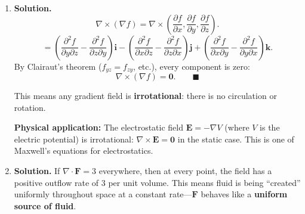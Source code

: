 \begin{enumerate}
Regrouping:
\[
= f\left(\frac{\partial F_1}{\partial x}+\frac{\partial F_2}{\partial y}+\frac{\partial F_3}{\partial z}\right)+\left(F_1\frac{\partial f}{\partial x}+F_2\frac{\partial f}{\partial y}+F_3\frac{\partial f}{\partial z}\right).
\]

\textbf{Right side:}
\[
f(\nabla\cdot\mathbf{F})+\mathbf{F}\cdot(\nabla f) = f\left(\frac{\partial F_1}{\partial x}+\frac{\partial F_2}{\partial y}+\frac{\partial F_3}{\partial z}\right)+\left(F_1 f_x+F_2 f_y+F_3 f_z\right).
\]

Both sides are identical. $\blacksquare$

\textbf{Physical interpretation:} The net outflow of the quantity $f\mathbf{F}$ has two contributions: (1) $f\,\nabla\cdot\mathbf{F}$, which is the outflow due to $\mathbf{F}$ itself expanding/contracting, weighted by $f$; and (2) $\mathbf{F}\cdot\nabla f$, which is the transport of $f$ due to the flow $\mathbf{F}$ carrying $f$ from regions of high $f$ to low $f$ (or vice versa).

\item \textbf{Solution.}
\[
\nabla\times(\nabla f) = \nabla\times\left(\frac{\partial f}{\partial x},\frac{\partial f}{\partial y},\frac{\partial f}{\partial z}\right).
\]
\[
= \left(\frac{\partial^2 f}{\partial y\partial z}-\frac{\partial^2 f}{\partial z\partial y}\right)\mathbf{i} - \left(\frac{\partial^2 f}{\partial x\partial z}-\frac{\partial^2 f}{\partial z\partial x}\right)\mathbf{j} + \left(\frac{\partial^2 f}{\partial x\partial y}-\frac{\partial^2 f}{\partial y\partial x}\right)\mathbf{k}.
\]
By Clairaut's theorem ($f_{yz}=f_{zy}$, etc.), every component is zero:
\[
\nabla\times(\nabla f)=\mathbf{0}. \qquad\blacksquare
\]

This means any gradient field is \textbf{irrotational}: there is no circulation or rotation.

\textbf{Physical application:} The electrostatic field $\mathbf{E}=-\nabla V$ (where $V$ is the electric potential) is irrotational: $\nabla\times\mathbf{E}=\mathbf{0}$ in the static case. This is one of Maxwell's equations for electrostatics.

\item \textbf{Solution.}
If $\nabla\cdot\mathbf{F}=3$ everywhere, then at every point, the field has a positive outflow rate of $3$ per unit volume. This means fluid is being ``created'' uniformly throughout space at a constant rate---$\mathbf{F}$ behaves like a \textbf{uniform source of fluid}.


\end{enumerate}
